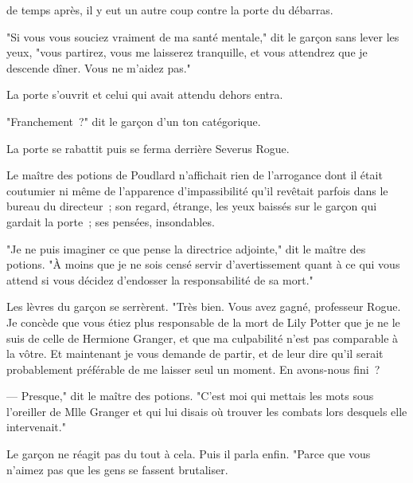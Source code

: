 
 de temps après, il y eut un autre coup contre la porte du débarras.

\hplettrineextrapara
"Si vous vous souciez vraiment de ma santé mentale," dit le garçon sans lever les yeux, "vous partirez, vous me laisserez tranquille, et vous attendrez que je descende dîner. Vous ne m'aidez pas."

La porte s'ouvrit et celui qui avait attendu dehors entra.

"Franchement~?" dit le garçon d'un ton catégorique.

La porte se rabattit puis se ferma derrière Severus Rogue.

Le maître des potions de Poudlard n'affichait rien de l'arrogance dont il était coutumier ni même de l'apparence d'impassibilité qu'il revêtait parfois dans le bureau du directeur~; son regard, étrange, les yeux baissés sur le garçon qui gardait la porte~; ses pensées, insondables.

"Je ne puis imaginer ce que pense la directrice adjointe," dit le maître des potions. "À moins que je ne sois censé servir d'avertissement quant à ce qui vous attend si vous décidez d'endosser la responsabilité de sa mort."

Les lèvres du garçon se serrèrent. "Très bien. Vous avez gagné, professeur Rogue. Je concède que vous étiez plus responsable de la mort de Lily Potter que je ne le suis de celle de Hermione Granger, et que ma culpabilité n'est pas comparable à la vôtre. Et maintenant je vous demande de partir, et de leur dire qu'il serait probablement préférable de me laisser seul un moment. En avons-nous fini~?

--- Presque," dit le maître des potions. "C'est moi qui mettais les mots sous l'oreiller de Mlle Granger et qui lui disais où trouver les combats lors desquels elle intervenait."

Le garçon ne réagit pas du tout à cela. Puis il parla enfin. "Parce que vous n'aimez pas que les gens se fassent brutaliser.

